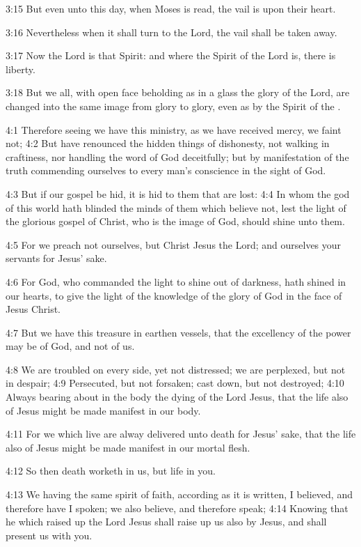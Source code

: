3:15 But even unto this day, when Moses is read, the vail is upon
their heart.

3:16 Nevertheless when it shall turn to the Lord, the vail shall be
taken away.

3:17 Now the Lord is that Spirit: and where the Spirit of the Lord is,
there is liberty.

3:18 But we all, with open face beholding as in a glass the glory of
the Lord, are changed into the same image from glory to glory, even as
by the Spirit of the \LORD.

4:1 Therefore seeing we have this ministry, as we have received mercy,
we faint not; 4:2 But have renounced the hidden things of dishonesty,
not walking in craftiness, nor handling the word of God deceitfully;
but by manifestation of the truth commending ourselves to every man's
conscience in the sight of God.

4:3 But if our gospel be hid, it is hid to them that are lost: 4:4 In
whom the god of this world hath blinded the minds of them which
believe not, lest the light of the glorious gospel of Christ, who is
the image of God, should shine unto them.

4:5 For we preach not ourselves, but Christ Jesus the Lord; and
ourselves your servants for Jesus' sake.

4:6 For God, who commanded the light to shine out of darkness, hath
shined in our hearts, to give the light of the knowledge of the glory
of God in the face of Jesus Christ.

4:7 But we have this treasure in earthen vessels, that the excellency
of the power may be of God, and not of us.

4:8 We are troubled on every side, yet not distressed; we are
perplexed, but not in despair; 4:9 Persecuted, but not forsaken; cast
down, but not destroyed; 4:10 Always bearing about in the body the
dying of the Lord Jesus, that the life also of Jesus might be made
manifest in our body.

4:11 For we which live are alway delivered unto death for Jesus' sake,
that the life also of Jesus might be made manifest in our mortal
flesh.

4:12 So then death worketh in us, but life in you.

4:13 We having the same spirit of faith, according as it is written, I
believed, and therefore have I spoken; we also believe, and therefore
speak; 4:14 Knowing that he which raised up the Lord Jesus shall raise
up us also by Jesus, and shall present us with you.

